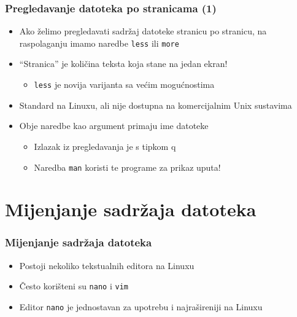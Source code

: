 \documentclass{beamer}
\newcommand{\shell}[1]{\texttt{\small #1}}
\begin{document}
\begin{frame}[t]
\frametitle{Pregledavanje datoteka po stranicama (1)}
\begin{itemize}
  \item Ako želimo pregledavati sadržaj datoteke stranicu po stranicu, na
        raspolaganju imamo naredbe \shell{less} ili \shell{more}
  \item ``Stranica'' je količina teksta koja stane na jedan ekran!
  \begin{itemize}
    \item \shell{less} je novija varijanta sa većim mogućnostima
  \end{itemize}
  \item Standard na Linuxu, ali nije dostupna na komercijalnim Unix
        sustavima
  \item Obje naredbe kao argument primaju ime datoteke
  \begin{itemize}
    \item Izlazak iz pregledavanja je s tipkom q
    \item Naredba \shell{man} koristi te programe za prikaz uputa!
  \end{itemize}
\end{itemize}
\end{frame}

\section{Mijenjanje sadržaja datoteka}
\begin{frame}[t]
\frametitle{Mijenjanje sadržaja datoteka}
\begin{itemize}
  \item Postoji nekoliko tekstualnih editora na Linuxu
  \item Često korišteni su \shell{nano} i \shell{vim}
  \item Editor \shell{nano} je jednostavan za upotrebu i najrašireniji na Linuxu
\end{itemize}
\end{frame}
\end{document}
